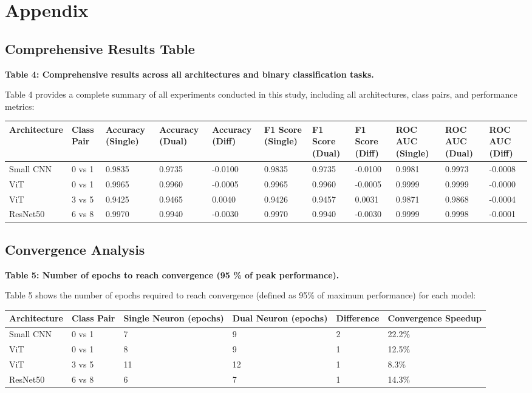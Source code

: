 \section{Appendix}

\subsection{Comprehensive Results Table}

\textbf{Table 4: Comprehensive results across all architectures and binary classification tasks.}

Table 4 provides a complete summary of all experiments conducted in this study, including all architectures, class pairs, and performance metrics:

\begin{tabular}{lllllllllll}
\hline
Architecture & Class Pair & Accuracy (Single) & Accuracy (Dual) & Accuracy (Diff) & F1 Score (Single) & F1 Score (Dual) & F1 Score (Diff) & ROC AUC (Single) & ROC AUC (Dual) & ROC AUC (Diff) \\
\hline
Small CNN & 0 vs 1 & 0.9835 & 0.9735 & -0.0100 & 0.9835 & 0.9735 & -0.0100 & 0.9981 & 0.9973 & -0.0008 \\
ViT & 0 vs 1 & 0.9965 & 0.9960 & -0.0005 & 0.9965 & 0.9960 & -0.0005 & 0.9999 & 0.9999 & -0.0000 \\
ViT & 3 vs 5 & 0.9425 & 0.9465 & 0.0040 & 0.9426 & 0.9457 & 0.0031 & 0.9871 & 0.9868 & -0.0004 \\
ResNet50 & 6 vs 8 & 0.9970 & 0.9940 & -0.0030 & 0.9970 & 0.9940 & -0.0030 & 0.9999 & 0.9998 & -0.0001 \\
\hline
\end{tabular}

\subsection{Convergence Analysis}

\textbf{Table 5: Number of epochs to reach convergence (95 \% of peak performance).}

Table 5 shows the number of epochs required to reach convergence (defined as 95\% of maximum performance) for each model:

\begin{tabular}{llllll}
\hline
Architecture & Class Pair & Single Neuron (epochs) & Dual Neuron (epochs) & Difference & Convergence Speedup \\
\hline
Small CNN & 0 vs 1 & 7 & 9 & 2 & 22.2\% \\
ViT & 0 vs 1 & 8 & 9 & 1 & 12.5\% \\
ViT & 3 vs 5 & 11 & 12 & 1 & 8.3\% \\
ResNet50 & 6 vs 8 & 6 & 7 & 1 & 14.3\% \\
\hline
\end{tabular}

